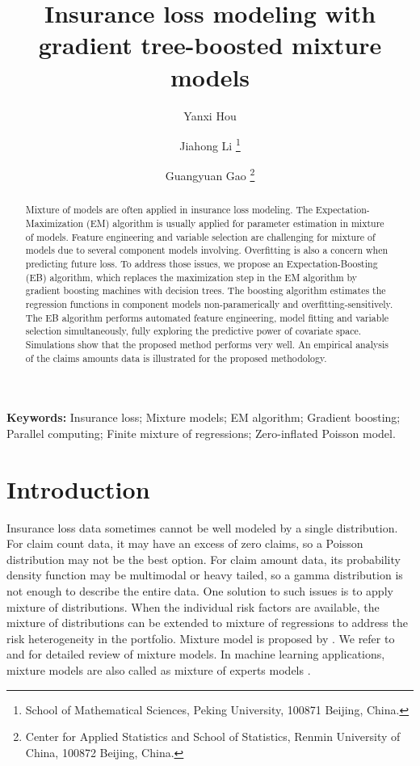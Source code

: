 \documentclass[11pt]{article}
\title{Insurance loss modeling with gradient tree-boosted mixture models}
\author{ Yanxi Hou \and Jiahong Li \footnote{School of Mathematical Sciences, Peking University, 100871 Beijing, China.} \and Guangyuan Gao \footnote{Center for Applied Statistics and School of Statistics, Renmin University of China, 100872 Beijing, China.}}
\numberwithin{equation}{section}
\begin{document}
\maketitle

\begin{abstract}
Mixture of models are often applied in insurance loss modeling. 
The Expectation-Maximization (EM) algorithm is usually applied for parameter estimation in mixture of models. 
Feature engineering and variable selection are challenging for mixture of models due to several component models involving. 
Overfitting is also a concern when predicting future loss. 
To address those issues, we propose an Expectation-Boosting (EB) algorithm, 
which replaces the maximization step in the EM algorithm by gradient boosting machines with decision trees. 
The boosting algorithm estimates the regression functions in component models non-paramerically and overfitting-sensitively. 
The EB algorithm performs automated feature engineering, model fitting and variable selection simultaneously, 
fully exploring the predictive power of covariate space.
Simulations show that the proposed method performs very well.
An empirical analysis of the claims amounts data is illustrated for the proposed methodology. 

\end{abstract}

{\bf Keywords:} Insurance loss; Mixture models; EM algorithm; Gradient boosting; Parallel computing; Finite mixture of regressions; Zero-inflated Poisson model. 


\section{Introduction}

Insurance loss data sometimes cannot be well modeled by a single distribution.
For claim count data, it may have an excess of zero claims, so a Poisson distribution may not be the best option.
For claim amount data, its probability density function may be multimodal or heavy tailed, so a gamma distribution is not enough to describe the entire data.
One solution to such issues is to apply mixture of distributions.
When the individual risk factors are available, the mixture of distributions can be extended to mixture of regressions to address the risk heterogeneity in the portfolio.
Mixture model is proposed by \citet{goldfeld1973markov}.
We refer to \citet{lindsay1995mixture} and \citet{peel2000finite} for detailed review of mixture models.
In machine learning applications, mixture models are also called as mixture of experts models \citep{jacobs1991adaptive,jiang1999hierarchical}.
\end{document}

